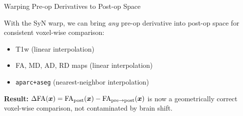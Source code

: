 \begin{frame}{Warping Pre-op Derivatives to Post-op Space}

  With the SyN warp, we can bring \emph{any} pre-op derivative into
  post-op space for consistent voxel-wise comparison:

  \bigskip

  \begin{itemize}
    \item T1w (linear interpolation)
    \item FA, MD, AD, RD maps (linear interpolation)
    \item \texttt{aparc+aseg} (nearest-neighbor interpolation)
  \end{itemize}

  \bigskip

  \textbf{Result:} $\Delta\text{FA}(\bm{x}) = \text{FA}_{\text{post}}(\bm{x})
  - \text{FA}_{\text{pre}\to\text{post}}(\bm{x})$ is now a geometrically
  correct voxel-wise comparison, not contaminated by brain shift.

  \bigskip

  \begin{center}
  \end{center}

\end{frame}

